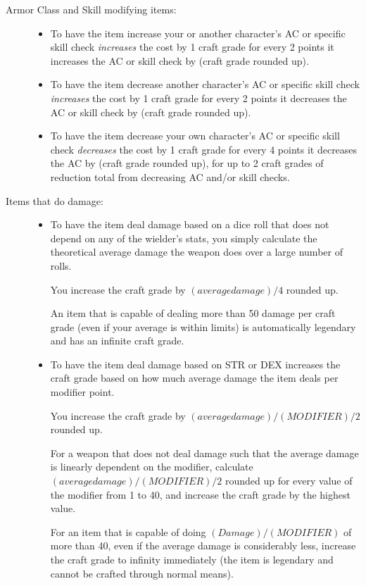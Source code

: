 \begin{description}
\begin{itemize}
	\end{itemize}
	\item[Armor Class and Skill modifying items:] \hfill
	\begin{itemize}
		\item To have the item increase your or another character's AC or specific skill check \emph{increases} the cost by 1 craft grade for every 2 points it increases the AC or skill check by (craft grade rounded up).
		\item To have the item decrease another character's AC or specific skill check \emph{increases} the cost by 1 craft grade for every 2 points it decreases the AC or skill check by (craft grade rounded up).
		\item To have the item decrease your own character's AC or specific skill check \emph{decreases} the cost by 1 craft grade for every 4 points it decreases the AC by (craft grade rounded up), for up to 2 craft grades of reduction total from decreasing AC and/or skill checks.
	\end{itemize}
	\item[Items that do damage:] \hfill
	\begin{itemize}
		\item To have the item deal damage based on a dice roll that does not depend on any of the wielder's stats, you simply calculate the theoretical average damage the weapon does over a large number of rolls.
		
		You increase the craft grade by $(average damage)/4$ rounded up.
		
		An item that is capable of dealing more than 50 damage per craft grade (even if your average is within limits) is automatically legendary and has an infinite craft grade.
		
		\item To have the item deal damage based on STR or DEX increases the craft grade based on how much average damage the item deals per modifier point.
		
		You increase the craft grade by $(average damage)/(MODIFIER)/2$ rounded up.
		
		For a weapon that does not deal damage such that the average damage is linearly dependent on the modifier, calculate $(average damage)/(MODIFIER)/2$ rounded up for every value of the modifier from 1 to 40, and increase the craft grade by the highest value.
		
		For an item that is capable of doing $(Damage)/(MODIFIER)$ of more than 40, even if the average damage is considerably less, increase the craft grade to infinity immediately (the item is legendary and cannot be crafted through normal means).
		

\end{itemize}
\end{description}
